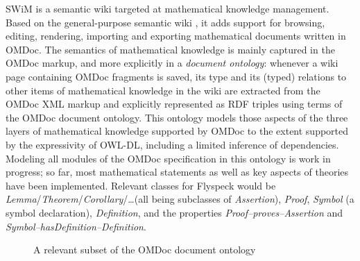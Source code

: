 SWiM is a semantic wiki targeted at mathematical knowledge management.  Based on
the general-purpose semantic wiki
\cite{KrSchVr:semwiki-reasoning07}, it adds support for
browsing, editing, rendering, importing and exporting mathematical documents
written in OMDoc.  The semantics of mathematical knowledge is mainly captured in
the OMDoc markup, and more explicitly in a \emph{document ontology}: whenever a
wiki page containing OMDoc fragments is saved, its type and its (typed)
relations to other items of mathematical knowledge in the wiki are extracted
from the OMDoc XML markup and explicitly represented as RDF triples using terms
of the OMDoc document ontology\cite{OMDocDocOnto:web}.  This ontology models
those aspects of the three layers of mathematical knowledge supported by OMDoc
to the extent supported by the expressivity of OWL-DL\cite{McGvHa:owl04},
including a limited inference of dependencies.  Modeling all modules of the
OMDoc specification in this ontology is work in progress; so far, most
mathematical statements as well as key aspects of theories have been
implemented.  Relevant classes for Flyspeck would be
\textit{Lemma}/\textit{Theorem}/\textit{Corollary}/\ldots (all being subclasses
of \textit{Assertion}), \textit{Proof}, \textit{Symbol} (a symbol declaration),
\textit{Definition}, and the properties \textit{Proof--proves--Assertion} and
\textit{Symbol--hasDefinition--Definition}.

\begin{figure}
  \centering
  \caption{A relevant subset of the OMDoc document ontology}
  \label{fig:doconto}
\end{figure}

